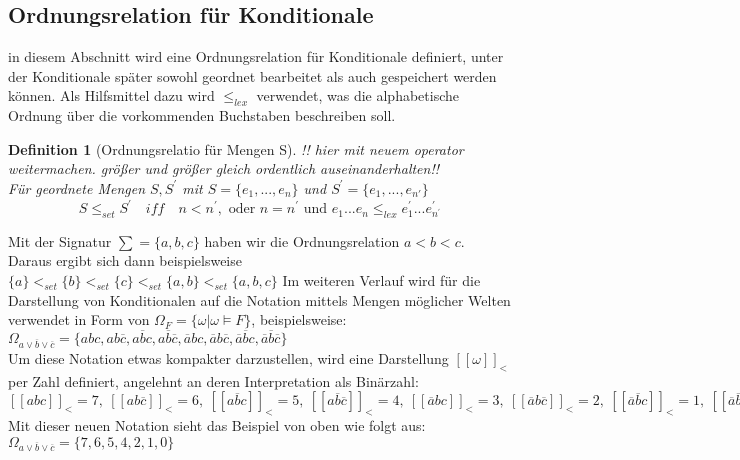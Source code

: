 \documentclass[12pt,a4paper]{article}
\newtheorem{theorem}{Definition}
\begin{document}
\subsection{Ordnungsrelation für Konditionale}
in diesem Abschnitt wird eine Ordnungsrelation für Konditionale definiert, unter der Konditionale später sowohl geordnet bearbeitet als auch gespeichert werden können. Als Hilfsmittel dazu wird $\leq_{lex}$ verwendet, was die alphabetische Ordnung über die vorkommenden Buchstaben beschreiben soll.
\begin{theorem}[Ordnungsrelatio für Mengen S]
!! hier mit neuem operator weitermachen. größer und größer gleich ordentlich auseinanderhalten!!\\
Für geordnete Mengen $S, S^\prime$ mit $S = \{e_1, ..., e_n\}$ und $S^\prime = \{e_{1}, ... , e_{n\prime}\}$
\begin{equation}
 S \leq_{set} S ^\prime \quad iff \quad n<n^\prime, \text{ oder } n = n ^\prime \text{ und } e_1...e_n  \leq_{lex}  e_1^\prime ... e_{n^\prime}^\prime
\end{equation}
\end{theorem}
Mit der Signatur $\sum = \{ a, b, c\}$ haben wir die Ordnungsrelation $a<b<c$. Daraus ergibt sich dann beispielsweise $\{a\} <_{set} \{b\} <_{set} \{c\} <_{set} \{a,b\} <_{set} \{a, b, c\}$
Im weiteren Verlauf wird für die Darstellung von Konditionalen auf die Notation mittels Mengen möglicher Welten verwendet in Form von $\Omega_F = \{\omega | \omega \models F \}$, beispielsweise: \\
$\Omega_{a\vee\overline{b}\vee \overline{c}} = \{abc,ab\overline{c},a\overline{b}c,a\overline{b}\overline{c},\overline{a}bc,\overline{a}b\overline{c},\overline{a}\overline{b}c,\overline{a}\overline{b}\overline{c}\}$ \\
Um diese Notation etwas kompakter darzustellen, wird eine Darstellung $[[\omega]]_<$ per Zahl definiert, angelehnt an deren Interpretation als Binärzahl: \\
$[[abc]]_<  = 7,\ 
[[ab\overline{c}]]_< = 6,\ 
[[a\overline{b}c]]_< = 5,\ 
[[a\overline{b}\overline{c}]]_< = 4 ,\
[[\overline{a}bc]]_< = 3,\ 
[[\overline{a}b\overline{c}]]_< = 2 ,\  
[[\overline{a}\overline{b}c]]_<  = 1,\ 
[[\overline{a}\overline{b}\overline{c}]]_< = 0 $ \\
Mit dieser neuen Notation sieht das Beispiel von oben wie folgt aus: \\
$\Omega_{a\vee\overline{b}\vee \overline{c}} = \{ 7,6,5,4,2,1,0\}$
\end{document}
